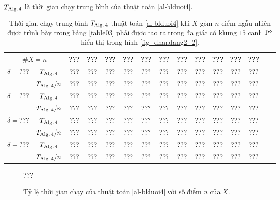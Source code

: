 \documentclass[12pt,a4paper,openany,oneside]{report}
\begin{document}
$T_{\rm Alg.\, 4}$ là thời gian chạy trung bình của thuật toán \ref{al-blduoi4}.

\begin{table}[ht]
	\begin{center}\renewcommand{\arraystretch}{1.2}\small
		\setlength\tabcolsep{0.05cm}
		\begin{tabular}{|c|c||c|c|c|c|c|c|c|c|c|c|c|c|c|}
			\hline
			\multicolumn {2}{|c||}{\footnotesize $\#X=n$}  & ???& ???& ???& ???& ???& ???& ???& ???& ???& ???& ??? \\ 
			\hline		
			\hline
			{ $\delta = ???$}
			
			& $T_{\rm Alg.\, 4}$  &   ???& ???& ???& ???& ???& ???& ???& ???& ???& ???& ??? \\
			
			& $T_{\rm Alg.\, 4}/n$& ???& ???& ???& ???& ???& ???& ???& ???& ???& ???& ???   \\
			\hline
			{ $\delta = ???$}
			
			& $T_{\rm Alg.\, 4}$  &   ???& ???& ???& ???& ???& ???& ???& ???& ???& ???& ??? \\
			
			& $T_{\rm Alg.\, 4}/n$& ???& ???& ???& ???& ???& ???& ???& ???& ???& ???& ???   \\
			\hline
			{ $\delta = ???$}
			
			& $T_{\rm Alg.\, 4}$  &   ???& ???& ???& ???& ???& ???& ???& ???& ???& ???& ??? \\
			
			& $T_{\rm Alg.\, 4}/n$& ???& ???& ???& ???& ???& ???& ???& ???& ???& ???& ???   \\
			\hline
			{ $\delta = ???$}
			
			& $T_{\rm Alg.\, 4}$  &   ???& ???& ???& ???& ???& ???& ???& ???& ???& ???& ??? \\
			
			& $T_{\rm Alg.\, 4}/n$& ???& ???& ???& ???& ???& ???& ???& ???& ???& ???& ???   \\
			\hline
		\end{tabular}
		\caption{Thời gian chạy trung bình $T_{\rm Alg.\, 4}$  thuật toán \ref{al-blduoi4} khi $X$ gồm $n$ điểm ngẫu nhiên được trình bày trong bảng \ref{table03} phải được tạo ra trong đa giác có khung $16$ cạnh  ${\cal P}^\diamond$ hiển thị trong hình \ref{fig_dhandang2_2}.}
		\label{table04}
	\end{center}
\end{table} 	

\begin{figure}[ht]
	\centering
	???
	\caption{Tỷ lệ thời gian chạy của thuật toán \ref{al-blduoi4} với số điểm $n$ của $X$.}
	\label{Figure04}
\end{figure}
\end{document}
